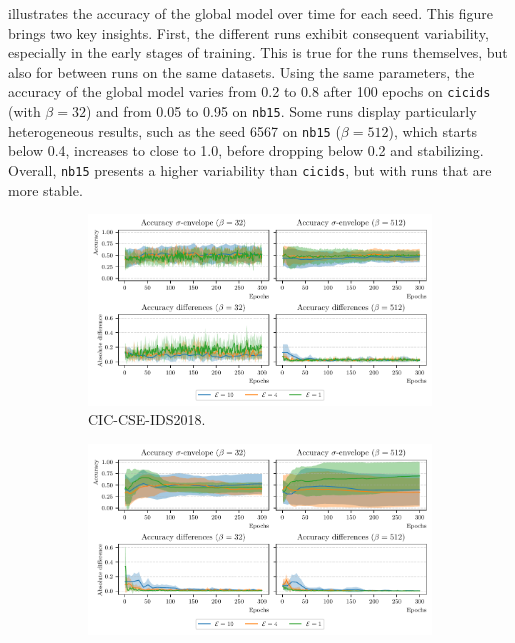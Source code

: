  illustrates the accuracy of the global model over time for each seed.
This figure brings two key insights.
First, the different runs exhibit consequent variability, especially in the early stages of training.
This is true for the runs themselves, but also for between runs on the same datasets.
Using the same parameters, the accuracy of the global model varies from 0.2 to 0.8 after 100 epochs on \texttt{cicids} (with $\beta=32$) and from 0.05 to 0.95 on \texttt{nb15}.
Some runs display particularly heterogeneous results, such as the seed 6567 on \texttt{nb15} ($\beta=512$), which starts below 0.4, increases to close to 1.0, before dropping below 0.2 and stabilizing.
Overall, \texttt{nb15} presents a higher variability than \texttt{cicids}, but with runs that are more stable.

\begin{figure}
  \centering
  \begin{subfigure}{\linewidth}
    \centering
    \includegraphics[width=\linewidth]{figures/cicids/predictability-all.pdf}
    \caption{
      CIC-CSE-IDS2018.
      \label{fig:predictability.cicids}
    }
  \end{subfigure}
  \begin{subfigure}{\linewidth}
    \centering
    \includegraphics[width=\linewidth]{figures/nb15/predictability-all.pdf}

\end{subfigure}
\end{figure}
